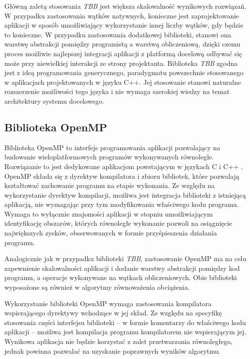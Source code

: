 Główną zaletą stosowania \emph{TBB} jest większa skalowalność wynikowych rozwiązań. 
W przypadku zastosowania wątków natywnych, konieczne jest zaprojektowanie aplikacji w sposób umożliwiający wykorzystanie innej liczby wątków, gdy będzie to konieczne. 
W przypadku zastosowania dodatkowej biblioteki, stanowi ona warstwę abstrakcji pomiędzy programistą a warstwą obliczeniową, dzięki czemu proces możliwie najlepszej integracji aplikacji z platformą docelową odbywać się może przy niewielkiej interakcji ze strony projektanta.
Biblioteka \emph{TBB} zgodna jest z ideą programowania generycznego, paradygmatu powszechnie stosowanego w aplikacjach projektowanych w języku C++.
Jej stosowanie stanowi naturalne rozszerzenie możliwości tego języka i nie wymaga szerokiej wiedzy na temat architektury systemu docelowego.

\subsection{Biblioteka OpenMP}

Biblioteka OpenMP to interfejs programowania aplikacji pozwalający na budowanie wieloplatformowych programów wykonywanych równolegle. 
Rozwiązanie to jest dedykowane aplikacjom powstającym w językach C i C++ \cite{openmp-guide}.
OpenMP składa się z dyrektyw kompilatora i zbioru bibliotek, które pozwalają kształtować zachowanie programu na etapie wykonania. %
Ze względu na wykorzystanie dyrektyw kompilacji, możliwa jest integracja biblioteki z istniejącą aplikacją, nie wymagając przy tym modyfikowania właściwego kodu programu. 
Wymaga to wyłącznie znajomości aplikacji w stopniu umożliwiającym identyfikację obszarów, których równoległe wykonanie pozwoli na osiągnięcie największych zysków, obserwowanych w formie przyśpieszenia działania programu. %

Analogicznie jak w przypadku biblioteki \emph{TBB}, zastosowanie OpenMP ma na celu zapewnienie skalowalności aplikacji i dodanie warstwy abstrakcji pomiędzy kod programu, a operacje wykonywane na wątkach obliczeniowych. 
Obie biblioteki wyposażone są również w algorytmy równoważenia obciążenia.

Wykorzystanie biblioteki OpenMP wymaga zastosowania kompilatora wspierającego dyrektywy wchodzące w jej skład. 
Ze względu na specyfikę stosowania części interfejsu biblioteki -- w formie komentarzy do właściwego kodu aplikacji -- możliwa jest kompilacja programu kompilatorem nie wspierającym jej. 
Wynikowa aplikacja nie będzie korzystać z zalet przetwarzania równoległego, jednak powinna pozwalać na uzyskanie poprawnych wyników algorytmu.

